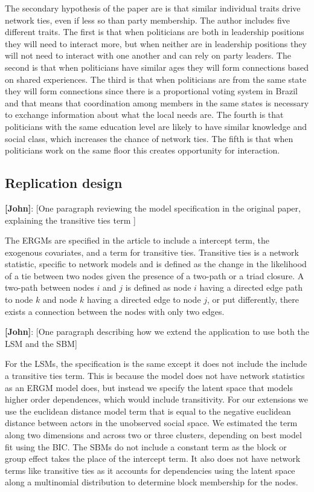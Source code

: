 \documentclass[fleqn,12pt]{wlscirep}
\begin{document}
The secondary hypothesis of the paper are is that similar individual traits drive network ties, even if less so than party membership. The author includes five different traits. The first is that when politicians are both in leadership positions they will need to interact more, but when neither are in leadership positions they will not need to interact with one another and can rely on party leaders. The second is that when politicians have similar ages they will form connections based on shared experiences.  The third is that when politicians are from the same state they will form connections since there is a proportional voting system in Brazil and that means that coordination among members in the same states is necessary to exchange information about what the local needs are. The fourth is that politicians with the same education level are likely to have similar knowledge and social class, which increases the chance of network ties. The fifth is that when politicians work on the same floor this creates opportunity for interaction.


\subsection{Replication design}

 {\bf [John]}: [One paragraph reviewing the model specification in the original paper, explaining the transitive ties term ]
 
The ERGMs are specified in the article to include a intercept term, the exogenous covariates, and a term for transitive ties. Transitive ties is a network statistic, specific to network models and is defined as the change in the likelihood of a tie between two nodes given the presence of a two-path or a triad closure. A two-path between nodes $i$ and $j$ is defined as node $i$ having a directed edge path to node $k$ and node $k$ having a directed edge to node $j$, or put differently, there exists a connection between the nodes with only two edges.
 

 {\bf [John]}: [One paragraph describing how we extend the application to use both the LSM and the SBM]

For the LSMs, the specification is the same except it does not include the include a transitive ties term. This is because the model does not have network statistics as an ERGM model does, but instead we specify the latent space that models higher order dependences, which would include transitivity. For our extensions we use the euclidean distance model term that is equal to the negative euclidean distance between actors in the unobserved social space. We estimated the term along two dimensions and across two or three clusters, depending on best model fit using the BIC. The SBMs do not include a constant term as the block or group effect takes the place of the intercept term. It also does not have network terms like transitive ties as it accounts for dependencies using the latent space along a multinomial distribution to determine block membership for the nodes. 
\end{document}
